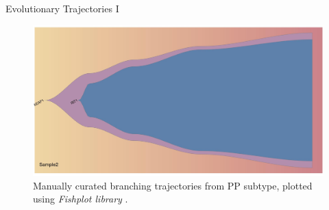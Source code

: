 \documentclass{beamer}
\begin{document}
\begin{frame}{Evolutionary Trajectories I}
{\begin{figure}
            \includegraphics[scale = 0.09]{img/branch2.jpg}
            \caption{Manually curated branching trajectories from PP subtype, plotted using \textit{Fishplot library} \cite{fishplot}.}
        \end{figure}
    }
\end{frame}
\end{document}
